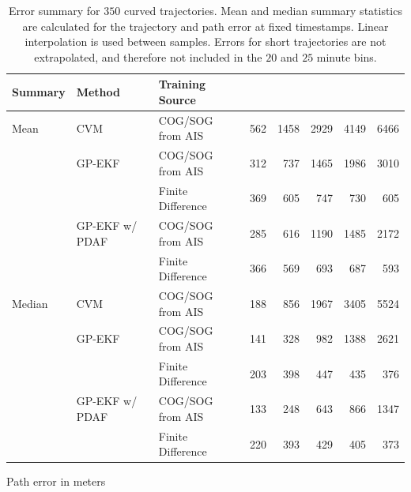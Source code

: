 \begin{table}[h]
\begin{subtable}{\textwidth}
{\begin{tabular}{lllrrrrr}
                Summary & Method         & Training Source   &     &      &      &      &      \\
                \midrule
                Mean    & CVM            & COG/SOG from AIS  & 562 & 1458 & 2929 & 4149 & 6466 \\
                        & GP-EKF         & COG/SOG from AIS  & 312 & 737  & 1465 & 1986 & 3010 \\
                        &                & Finite Difference & 369 & 605  & 747  & 730  & 605  \\
                        & GP-EKF w/ PDAF & COG/SOG from AIS  & 285 & 616  & 1190 & 1485 & 2172 \\
                        &                & Finite Difference & 366 & 569  & 693  & 687  & 593  \\
                \midrule
                Median  & CVM            & COG/SOG from AIS  & 188 & 856  & 1967 & 3405 & 5524 \\
                        & GP-EKF         & COG/SOG from AIS  & 141 & 328  & 982  & 1388 & 2621 \\
                        &                & Finite Difference & 203 & 398  & 447  & 435  & 376  \\
                        & GP-EKF w/ PDAF & COG/SOG from AIS  & 133 & 248  & 643  & 866  & 1347 \\
                        &                & Finite Difference & 220 & 393  & 429  & 405  & 373  \\
                \bottomrule
            \end{tabular}
        }
        \caption{Path error in meters}
        \label{table:stats_curved_path_err}
    \end{subtable}
    \caption{Error summary for $350$ curved trajectories. Mean and median summary statistics are calculated for the trajectory and path error at fixed timestamps. Linear interpolation is used between samples. Errors for short trajectories are not extrapolated, and therefore not included in the $20$ and $25$ minute bins.}
    \label{table:stats_curved_error}
\end{table}

